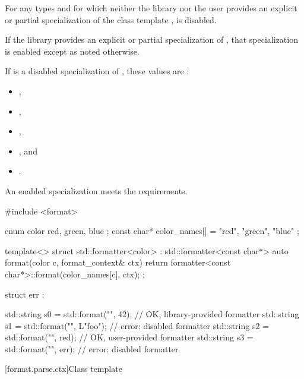 \pnum
For any types  and  for which
neither the library nor the user provides
an explicit or partial specialization of
the class template ,
 is disabled.

\pnum
If the library provides an explicit or partial specialization of
, that specialization is enabled
except as noted otherwise.

\pnum
If  is a disabled specialization of , these
values are :
\begin{itemize}
\item {},
\item {},
\item {},
\item {}, and
\item {}.
\end{itemize}

\pnum
An enabled specialization  meets the
 requirements.
\begin{example}
\begin{codeblock}
#include <format>

enum color { red, green, blue };
const char* color_names[] = { "red", "green", "blue" };

template<> struct std::formatter<color> : std::formatter<const char*> {
  auto format(color c, format_context& ctx) {
    return formatter<const char*>::format(color_names[c], ctx);
  }
};

struct err {};

std::string s0 = std::format("{}", 42);         // OK, library-provided formatter
std::string s1 = std::format("{}", L"foo");     // error: disabled formatter
std::string s2 = std::format("{}", red);        // OK, user-provided formatter
std::string s3 = std::format("{}", err{});      // error: disabled formatter
\end{codeblock}
\end{example}

[format.parse.ctx]{Class template }

